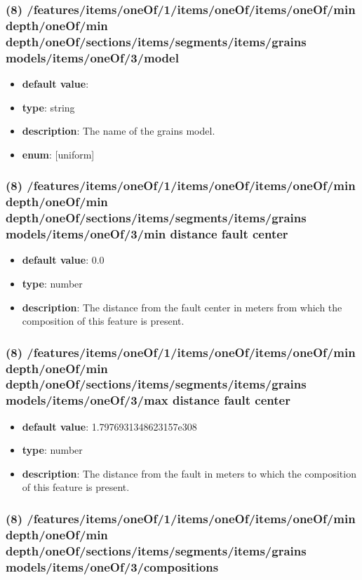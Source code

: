 \subsubsection{(8) /features/items/oneOf/1/items/oneOf/items/oneOf/min depth/oneOf/min depth/oneOf/sections/items/segments/items/grains models/items/oneOf/3/model}
\begin{itemize}[leftmargin=8em]\item {\bf default value}: 
\item {\bf type}: string
\item {\bf description}: The name of the grains model.
\item {\bf enum}: [uniform]\end{itemize}\subsubsection{(8) /features/items/oneOf/1/items/oneOf/items/oneOf/min depth/oneOf/min depth/oneOf/sections/items/segments/items/grains models/items/oneOf/3/min distance fault center}
\begin{itemize}[leftmargin=8em]\item {\bf default value}: 0.0
\item {\bf type}: number
\item {\bf description}: The distance from the fault center in meters from which the composition of this feature is present.
\end{itemize}\subsubsection{(8) /features/items/oneOf/1/items/oneOf/items/oneOf/min depth/oneOf/min depth/oneOf/sections/items/segments/items/grains models/items/oneOf/3/max distance fault center}
\begin{itemize}[leftmargin=8em]\item {\bf default value}: 1.7976931348623157e308
\item {\bf type}: number
\item {\bf description}: The distance from the fault in meters to which the composition of this feature is present.
\end{itemize}\subsubsection{(8) /features/items/oneOf/1/items/oneOf/items/oneOf/min depth/oneOf/min depth/oneOf/sections/items/segments/items/grains models/items/oneOf/3/compositions}

